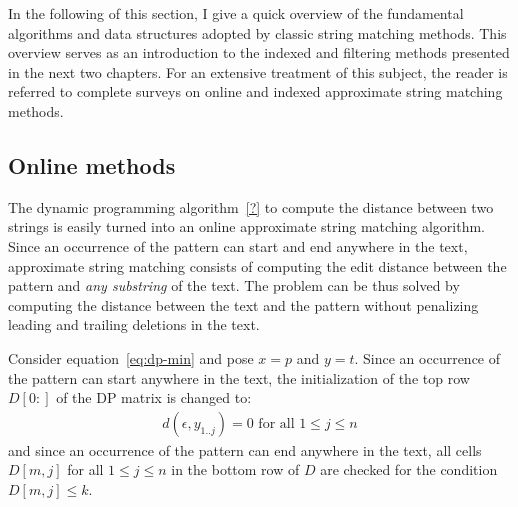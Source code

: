 In the following of this section, I give a quick overview of the fundamental algorithms and data structures adopted by classic string matching methods.
This overview serves as an introduction to the indexed and filtering methods presented in the next two chapters.
For an extensive treatment of this subject, the reader is referred to complete surveys on online \citep{Navarro2001a} and indexed \citep{Navarro2001} approximate string matching methods.


\subsection{Online methods}
\label{sub:introonline}





The dynamic programming algorithm~\ref{?} to compute the distance between two strings is easily turned into an online approximate string matching algorithm.
Since an occurrence of the pattern can start and end anywhere in the text, approximate string matching consists of computing the edit distance between the pattern and \emph{any substring} of the text.
The problem can be thus solved by computing the distance between the text and the pattern without penalizing leading and trailing deletions in the text.

Consider equation~\ref{eq:dp-min} and pose $x=p$ and $y=t$.
Since an occurrence of the pattern can start anywhere in the text, the initialization of the top row $D[0:]$ of the DP matrix is changed to:
\begin{eqnarray}
d(\epsilon, y_{1..j}) = 0 \text{ for all } 1 \leq j \leq n
\end{eqnarray}
and since an occurrence of the pattern can end anywhere in the text, all cells $D[m,j]$ for all $1 \leq j \leq n$ in the bottom row of $D$ are checked for the condition $D[m,j] \leq k$.

